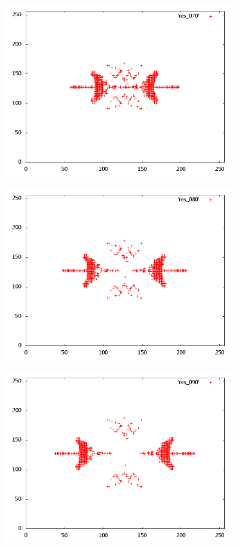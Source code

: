 \begin{center}
\includegraphics[width=4in]{res_070.png}
\end{center}
\begin{center}
\includegraphics[width=4in]{res_080.png}
\end{center}
\begin{center}
\includegraphics[width=4in]{res_090.png}
\end{center}
